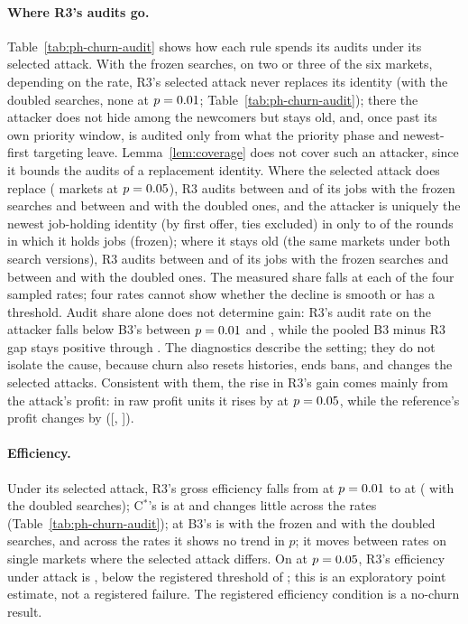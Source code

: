 \documentclass[11pt]{article}
\begin{document}
\paragraph{Where R3's audits go.} Table~\ref{tab:ph-churn-audit} shows how each rule spends its audits under its selected attack. With the frozen searches, on two or three of the six markets, depending on the rate, R3's selected attack never replaces its identity (with the doubled searches, none at $p = 0.01$; Table~\ref{tab:ph-churn-audit}); there the attacker does not hide among the newcomers but stays old, and, once past its own priority window, is audited only from what the priority phase and newest-first targeting leave. Lemma~\ref{lem:coverage} does not cover such an attacker, since it bounds the audits of a replacement identity. Where the selected attack does replace ( markets at $p = 0.05$), R3 audits between  and  of its jobs with the frozen searches and between  and  with the doubled ones, and the attacker is uniquely the newest job-holding identity (by first offer, ties excluded) in only  to  of the rounds in which it holds jobs (frozen); where it stays old (the same  markets under both search versions), R3 audits between  and  of its jobs with the frozen searches and between  and  with the doubled ones. The measured share falls at each of the four sampled rates; four rates cannot show whether the decline is smooth or has a threshold. Audit share alone does not determine gain: R3's audit rate on the attacker falls below B3's between $p = 0.01$ and , while the pooled B3 minus R3 gap stays positive through . The diagnostics describe the setting; they do not isolate the cause, because churn also resets histories, ends bans, and changes the selected attacks. Consistent with them, the rise in R3's gain comes mainly from the attack's profit: in raw profit units it rises by  at $p = 0.05$, while the reference's profit changes by  ([, ]).

\paragraph{Efficiency.} Under its selected attack, R3's gross efficiency falls from  at $p = 0.01$ to  at  ( with the doubled searches); C$^*$'s is  at  and changes little across the rates (Table~\ref{tab:ph-churn-audit}); at  B3's is  with the frozen and  with the doubled searches, and across the rates it shows no trend in $p$; it moves between rates on single markets where the selected attack differs. On  at $p = 0.05$, R3's efficiency under attack is , below the registered threshold of ; this is an exploratory point estimate, not a registered failure. The registered efficiency condition is a no-churn result.
\end{document}

